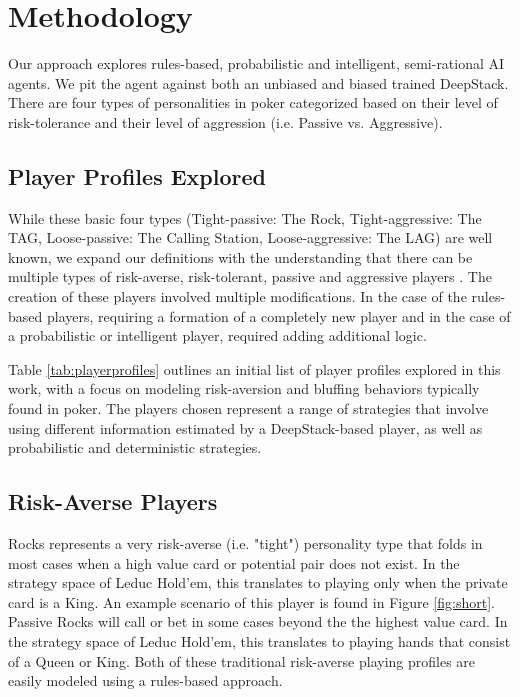 \documentclass{article}
\begin{document}
\section{Methodology}
Our approach explores rules-based, probabilistic and intelligent, semi-rational AI agents. We pit the agent against both an unbiased and biased trained DeepStack. There are four types of personalities in poker categorized based on their level of risk-tolerance and their level of aggression (i.e. Passive vs. Aggressive).

\subsection{Player Profiles Explored}
\indent While these basic four types (Tight-passive: The Rock, Tight-aggressive: The TAG, Loose-passive: The Calling Station, Loose-aggressive: The LAG) are well known, we expand our definitions with the understanding that there can be multiple types of risk-averse, risk-tolerant, passive and aggressive players \cite{teafilo}. The creation of these players involved multiple modifications. In the case of the rules-based players, requiring a formation of a completely new player 
and in the case of a probabilistic or intelligent player, required adding additional logic.%

\indent Table \ref{tab:playerprofiles} outlines an initial list of player profiles explored in this work, with a focus on modeling risk-aversion and bluffing behaviors typically found in poker.  The players chosen represent a range of strategies that involve using different information estimated by a DeepStack-based player, as well as probabilistic and deterministic strategies.

\subsection{Risk-Averse Players}
Rocks represents a very risk-averse (i.e. "tight") personality type that folds in most cases when a high value card or potential pair does not exist. In the strategy space of Leduc Hold'em, this translates to playing only when the private card is a King. An example scenario of this player is found in Figure \ref{fig:short}. Passive Rocks will call or bet in some cases beyond the the highest value card. In the strategy space of Leduc Hold'em, this translates to playing hands that consist of a Queen or King. Both of these traditional risk-averse playing profiles are easily modeled using a rules-based approach.
\end{document}
